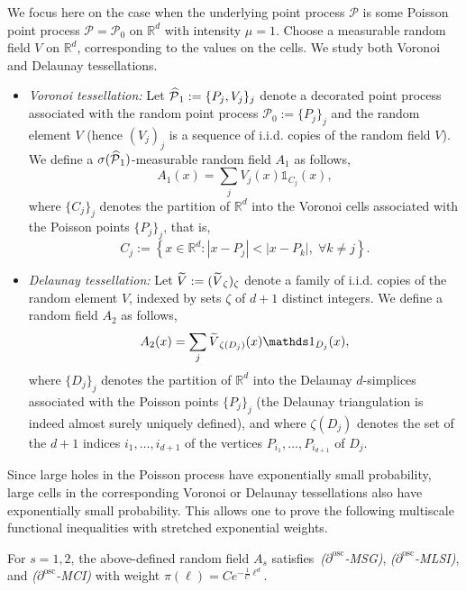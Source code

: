 \documentclass[AHL,Unicode,longabstracts]{cedram}
\newcommand{\R}{\mathbb R}
\newcommand{\Pc}{\mathcal P}
\newcommand{\osc}{\partial^{\mathrm{osc}}}
\let\oldtilde\tilde
\renewcommand*{\tilde}[1]{\mathchoice{\widetilde{#1}}{\widetilde{#1}}{\oldtilde{#1}}{\oldtilde{#1}}}\let\oldhat\hat
\renewcommand*{\hat}[1]{\mathchoice{\widehat{#1}}{\widehat{#1}}{\oldhat{#1}}{\oldhat{#1}}}\let\oldexists\exists
\renewcommand*{\exists}{\mathrel{\oldexists}}
\let\oldforall\forall
\renewcommand*{\forall}{\mathrel{\oldforall}}
\begin{document}
We focus here on the case when the underlying point process $\Pc$ is some Poisson point process $\Pc=\Pc_0$ on $\R^d$ with intensity $\mu=1$. Choose a measurable random field $V$ on $\R^d$, corresponding to the values on the cells. We study both Voronoi and Delaunay tessellations.
\begin{itemize}
\item \emph{Voronoi tessellation:} Let $\hat\Pc_1:=\{P_j,V_j\}_j$ denote a decorated point process associated with the random point process $\Pc_0:=\{P_j\}_j$ and the random element $V$ (hence $(V_j)_j$ is a sequence of i.i.d. copies of the random field $V$). We define a $\sigma(\hat\Pc_1)$-measurable random field $A_1$ as follows,
\[
A_1(x)=\sum_jV_j(x)\mathds1_{C_j}(x),
\]
where $\{C_j\}_j$ denotes the partition of $\R^d$ into the Voronoi cells associated with the Poisson points $\{P_j\}_j$, that is,
\[
C_j:=\left\{x\in\R^d:|x-P_j|<|x-P_k|,\;\forall k\ne j\right\}.
\]
\item \emph{Delaunay tessellation:} Let $\tilde V:=(\tilde V_\zeta)_\zeta$ denote a family of i.i.d. copies of the random element $V$, indexed by sets $\zeta$ of $d+1$ distinct integers. We define a random field $A_2$ as follows,
\[
A_2(x)=\sum_j \tilde V_{\zeta(D_j)}(x)\mathds1_{D_j}(x),
\]
where $\{D_j\}_j$ denotes the partition of $\R^d$ into the Delaunay $d$-simplices associated with the Poisson points $\{P_j\}_j$ (the Delaunay triangulation is indeed almost surely uniquely defined), and where $\zeta(D_j)$ denotes the set of the $d+1$ indices $i_1,\dots,i_{d+1}$ of the vertices $P_{i_1},\dots,P_{i_{d+1}}$ of $D_j$.
\end{itemize}

Since large holes in the Poisson process have exponentially small probability, large cells in the corresponding Voronoi or Delaunay tessellations also have exponentially small probability. This allows one to prove the following multiscale functional \linebreak inequalities with stretched exponential weights.

\begin{prop}\label{prop:voronoi}
For $s=1,2$, the above-defined random field $A_s$ satisfies~\emph{($\osc$-MSG)}, \emph{($\osc$-MLSI)}, and \emph{($\osc$-MCI)} with weight $\pi(\ell)=Ce^{-\frac1C\ell^d}$.
\end{prop}
\end{document}
